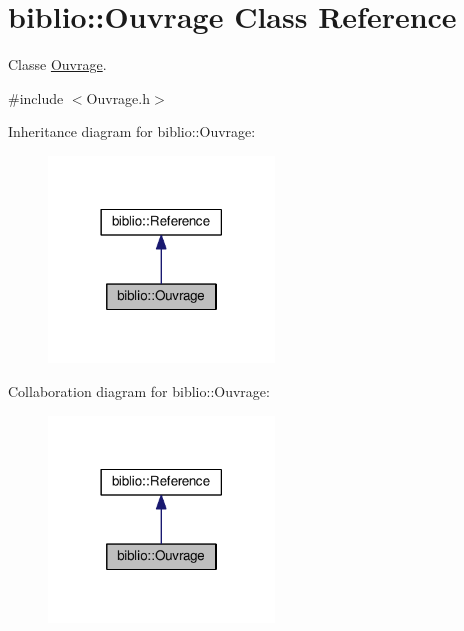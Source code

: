 \hypertarget{classbiblio_1_1Ouvrage}{}\section{biblio\+:\+:Ouvrage Class Reference}
\label{classbiblio_1_1Ouvrage}


Classe \hyperlink{classbiblio_1_1Ouvrage}{Ouvrage}.  




{\ttfamily \#include $<$Ouvrage.\+h$>$}



Inheritance diagram for biblio\+:\+:Ouvrage\+:\nopagebreak
\begin{figure}[H]
\begin{center}
\leavevmode
\includegraphics[width=170pt]{classbiblio_1_1Ouvrage__inherit__graph}
\end{center}
\end{figure}


Collaboration diagram for biblio\+:\+:Ouvrage\+:\nopagebreak
\begin{figure}[H]
\begin{center}
\leavevmode
\includegraphics[width=170pt]{classbiblio_1_1Ouvrage__coll__graph}
\end{center}
\end{figure}
